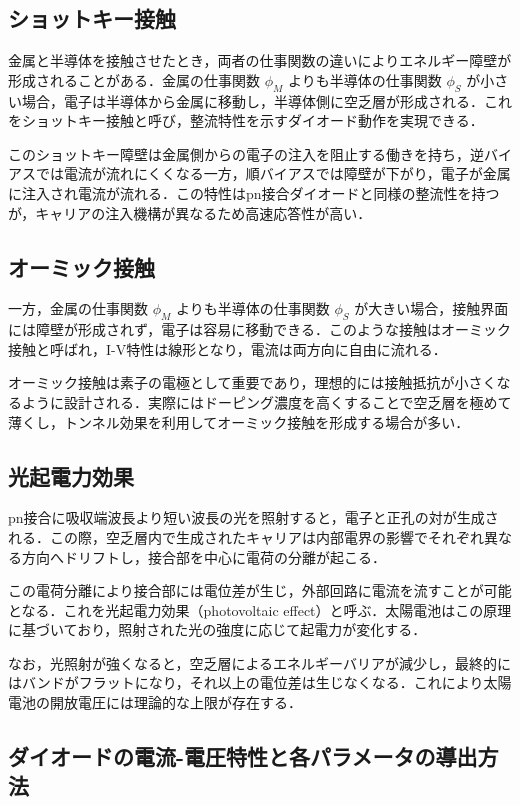 \subsection{ショットキー接触}

金属と半導体を接触させたとき，両者の仕事関数の違いによりエネルギー障壁が形成されることがある．金属の仕事関数 $\phi_M$ よりも半導体の仕事関数 $\phi_S$ が小さい場合，電子は半導体から金属に移動し，半導体側に空乏層が形成される．これをショットキー接触と呼び，整流特性を示すダイオード動作を実現できる．

このショットキー障壁は金属側からの電子の注入を阻止する働きを持ち，逆バイアスでは電流が流れにくくなる一方，順バイアスでは障壁が下がり，電子が金属に注入され電流が流れる．この特性はpn接合ダイオードと同様の整流性を持つが，キャリアの注入機構が異なるため高速応答性が高い．

\subsection{オーミック接触}

一方，金属の仕事関数 $\phi_M$ よりも半導体の仕事関数 $\phi_S$ が大きい場合，接触界面には障壁が形成されず，電子は容易に移動できる．このような接触はオーミック接触と呼ばれ，I-V特性は線形となり，電流は両方向に自由に流れる．

オーミック接触は素子の電極として重要であり，理想的には接触抵抗が小さくなるように設計される．実際にはドーピング濃度を高くすることで空乏層を極めて薄くし，トンネル効果を利用してオーミック接触を形成する場合が多い．

\subsection{光起電力効果}

pn接合に吸収端波長より短い波長の光を照射すると，電子と正孔の対が生成される．この際，空乏層内で生成されたキャリアは内部電界の影響でそれぞれ異なる方向へドリフトし，接合部を中心に電荷の分離が起こる．

この電荷分離により接合部には電位差が生じ，外部回路に電流を流すことが可能となる．これを光起電力効果（photovoltaic effect）と呼ぶ．太陽電池はこの原理に基づいており，照射された光の強度に応じて起電力が変化する．

なお，光照射が強くなると，空乏層によるエネルギーバリアが減少し，最終的にはバンドがフラットになり，それ以上の電位差は生じなくなる．これにより太陽電池の開放電圧には理論的な上限が存在する．
\subsection{ダイオードの電流-電圧特性と各パラメータの導出方法}

